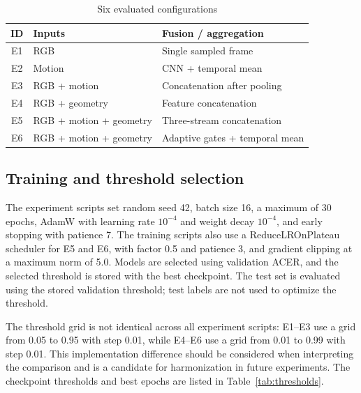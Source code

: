 \documentclass[a4paper,conference]{IEEEtran}
\begin{document}
\begin{table}[t]
\caption{Six evaluated configurations}
\label{tab:configs}
\centering\footnotesize
\begin{tabular}{cll}
\toprule
ID & Inputs & Fusion / aggregation \\
\midrule
E1 & RGB & Single sampled frame \\
E2 & Motion & CNN + temporal mean \\
E3 & RGB + motion & Concatenation after pooling \\
E4 & RGB + geometry & Feature concatenation \\
E5 & RGB + motion + geometry & Three-stream concatenation \\
E6 & RGB + motion + geometry & Adaptive gates + temporal mean \\
\bottomrule
\end{tabular}
\end{table}

\subsection{Training and threshold selection}
The experiment scripts set random seed 42, batch size 16, a maximum of 30 epochs, AdamW with learning rate $10^{-4}$ and weight decay $10^{-4}$, and early stopping with patience 7. The training scripts also use a ReduceLROnPlateau scheduler for E5 and E6, with factor 0.5 and patience 3, and gradient clipping at a maximum norm of 5.0. Models are selected using validation ACER, and the selected threshold is stored with the best checkpoint. The test set is evaluated using the stored validation threshold; test labels are not used to optimize the threshold.

The threshold grid is not identical across all experiment scripts: E1--E3 use a grid from 0.05 to 0.95 with step 0.01, while E4--E6 use a grid from 0.01 to 0.99 with step 0.01. This implementation difference should be considered when interpreting the comparison and is a candidate for harmonization in future experiments. The checkpoint thresholds and best epochs are listed in Table~\ref{tab:thresholds}.
\end{document}
